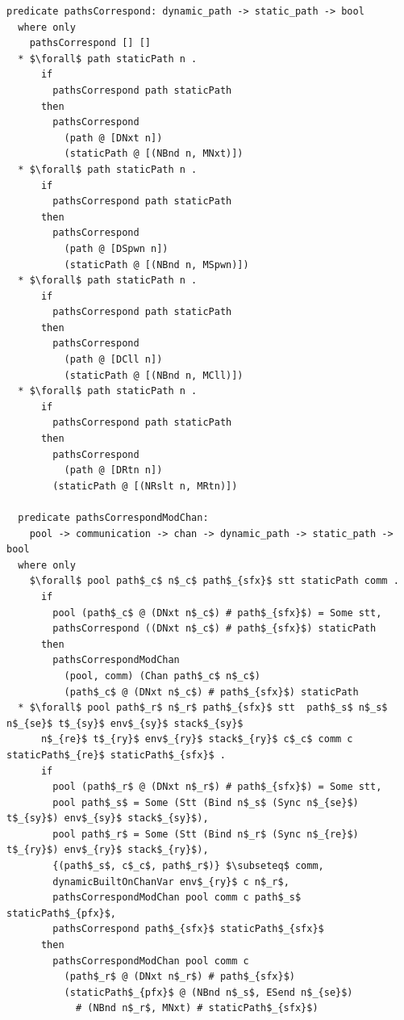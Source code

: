 \documentclass[letterpaper, 11pt]{extarticle}
\begin{document}
\begin{lstlisting}[language=logic, mathescape]
  predicate pathsCorrespond: dynamic_path -> static_path -> bool
  where only
    pathsCorrespond [] []
  * $\forall$ path staticPath n .
      if
        pathsCorrespond path staticPath
      then
        pathsCorrespond
          (path @ [DNxt n])
          (staticPath @ [(NBnd n, MNxt)])
  * $\forall$ path staticPath n .
      if
        pathsCorrespond path staticPath
      then
        pathsCorrespond
          (path @ [DSpwn n])
          (staticPath @ [(NBnd n, MSpwn)])
  * $\forall$ path staticPath n .
      if
        pathsCorrespond path staticPath
      then
        pathsCorrespond
          (path @ [DCll n])
          (staticPath @ [(NBnd n, MCll)])
  * $\forall$ path staticPath n .
      if
        pathsCorrespond path staticPath
      then
        pathsCorrespond
          (path @ [DRtn n])
        (staticPath @ [(NRslt n, MRtn)])

  predicate pathsCorrespondModChan:
    pool -> communication -> chan -> dynamic_path -> static_path -> bool
  where only
    $\forall$ pool path$_c$ n$_c$ path$_{sfx}$ stt staticPath comm .
      if
        pool (path$_c$ @ (DNxt n$_c$) # path$_{sfx}$) = Some stt,
        pathsCorrespond ((DNxt n$_c$) # path$_{sfx}$) staticPath
      then
        pathsCorrespondModChan
          (pool, comm) (Chan path$_c$ n$_c$)
          (path$_c$ @ (DNxt n$_c$) # path$_{sfx}$) staticPath
  * $\forall$ pool path$_r$ n$_r$ path$_{sfx}$ stt  path$_s$ n$_s$ n$_{se}$ t$_{sy}$ env$_{sy}$ stack$_{sy}$
      n$_{re}$ t$_{ry}$ env$_{ry}$ stack$_{ry}$ c$_c$ comm c staticPath$_{re}$ staticPath$_{sfx}$ . 
      if
        pool (path$_r$ @ (DNxt n$_r$) # path$_{sfx}$) = Some stt, 
        pool path$_s$ = Some (Stt (Bind n$_s$ (Sync n$_{se}$) t$_{sy}$) env$_{sy}$ stack$_{sy}$),
        pool path$_r$ = Some (Stt (Bind n$_r$ (Sync n$_{re}$) t$_{ry}$) env$_{ry}$ stack$_{ry}$),
        {(path$_s$, c$_c$, path$_r$)} $\subseteq$ comm, 
        dynamicBuiltOnChanVar env$_{ry}$ c n$_r$, 
        pathsCorrespondModChan pool comm c path$_s$ staticPath$_{pfx}$,
        pathsCorrespond path$_{sfx}$ staticPath$_{sfx}$
      then
        pathsCorrespondModChan pool comm c
          (path$_r$ @ (DNxt n$_r$) # path$_{sfx}$)
          (staticPath$_{pfx}$ @ (NBnd n$_s$, ESend n$_{se}$)
            # (NBnd n$_r$, MNxt) # staticPath$_{sfx}$)
\end{lstlisting}
\end{document}
